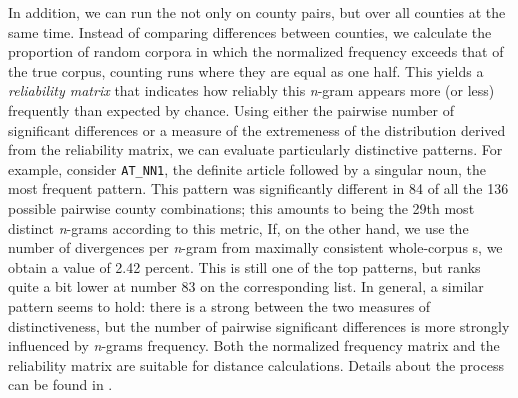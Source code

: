 \documentclass[output=paper]{LSP/langsci}
\begin{document}
In addition, we can run the  not only on county pairs, but over all counties at the same time.
Instead of comparing differences between counties, we calculate the proportion of random corpora in which the normalized frequency exceeds that of the true corpus, counting runs where they are equal as one half.
This yields a \emph{reliability matrix} that indicates how reliably this \emph{n}-gram appears more (or less) frequently than expected by chance.
Using either the pairwise number of significant differences or a measure of the extremeness of the distribution derived from the reliability matrix, we can evaluate particularly distinctive patterns.
For example, consider \texttt{AT\_NN1}, the definite article followed by a singular noun, the most frequent pattern.
This pattern was significantly different in 84 of all the 136 possible pairwise county combinations; this amounts to being the 29th most distinct \emph{n}-grams according to this metric,
If, on the other hand, we use the number of divergences per \emph{n}-gram from maximally consistent whole-corpus s, we obtain a value of 2.42 percent.
This is still one of the top patterns, but ranks quite a bit lower at number 83 on the corresponding list.
In general, a similar pattern seems to hold: there is a strong  between the two measures of distinctiveness, but the number of pairwise significant differences is more strongly influenced by \emph{n}-grams frequency.
Both the normalized frequency matrix and the reliability matrix are suitable for distance calculations.
Details about the process can be found in \citet[64-74]{wolk_integrating_2014}.
\end{document}
